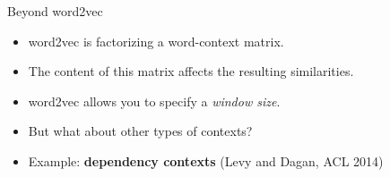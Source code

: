 \documentclass[compress]{beamer}
\begin{document}
\begin{frame}{Beyond word2vec}

    \begin{itemize}
        \item word2vec is factorizing a word-context matrix.
        \item The content of this matrix affects the resulting similarities.
        \item word2vec allows you to specify a \textit{window size}.
        \item But what about other types of contexts?
    \end{itemize}

    \begin{itemize}
        \item Example: \textbf{dependency contexts} {\footnotesize (Levy and
            Dagan, ACL 2014)}
    \end{itemize}

\end{frame}

{

}
\end{document}
